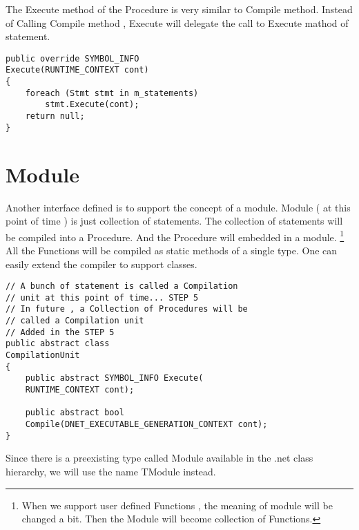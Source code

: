 The Execute method of the Procedure is very similar to Compile method. Instead of Calling Compile method , Execute will delegate the call to Execute mathod of statement.

\lstset{style=csharp}
\begin{lstlisting}
public override SYMBOL_INFO 
Execute(RUNTIME_CONTEXT cont)
{
	foreach (Stmt stmt in m_statements)
		stmt.Execute(cont);
	return null;
}
\end{lstlisting}

\section{Module}
Another interface defined is to support the concept of a module. Module ( at this point of time ) is just collection of
statements. The collection of statements will be compiled into a Procedure. And the Procedure will embedded in a module.
\footnote{When we support user defined Functions , the meaning of module will be changed a bit. Then the Module will become
collection of Functions.} All the Functions will be compiled as static methods of a single type. One can easily extend the
compiler to support classes.

\lstset{style=csharp}
\begin{lstlisting}
// A bunch of statement is called a Compilation
// unit at this point of time... STEP 5
// In future , a Collection of Procedures will be
// called a Compilation unit
// Added in the STEP 5
public abstract class 
CompilationUnit
{
	public abstract SYMBOL_INFO Execute(
	RUNTIME_CONTEXT cont);

	public abstract bool 
	Compile(DNET_EXECUTABLE_GENERATION_CONTEXT cont);
}
\end{lstlisting}
Since there is a preexisting type called Module available in the .net class hierarchy, we will use the name TModule instead.

